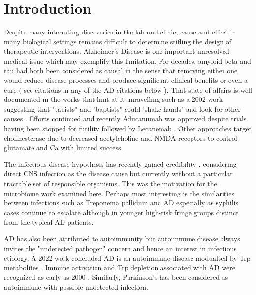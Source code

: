 \documentclass[aps,secnumarabic,balancelastpage,amsmath,amssymb,nofootinbib]{revtex4}
\begin{document}
\maketitle
\newpage
\tableofcontents
\newpage

\section{Introduction  }

Despite many interesting discoveries in the lab and clinic,
cause and effect in many biological settings remains difficult
to determine  stifling the design of therapeutic interventions.
Alzheimer's Disease is one important unresolved medical issue
which may exemplify this limitation. For decades, amyloid beta and tau
had both been considered as causal in the sense that removing
either one would reduce disease processes and produce
significant clinical benefits or even a cure
( see citations in any of the AD citations below ).  
That state of affairs is well documented 
in the works
that hint at it unravelling\cite{PMID37833948}  such as a 2002 work 
suggesting that  "tauists" and "baptists" could 'shake hands"
and look for other causes \cite{PMID11801334}. Efforts
continued and recently
Aducanumab was approved despite trials having been stopped for futility
\cite{PMC8491638}
followed by Lecanemab \cite{PMC10119064}
\cite{vanDyck_Swanson_Aisen_Lecanemab_Early_Alzheimer_2023}. 
Other approaches   target  cholinesterase  
 \cite{PMC4052996} 
due to decreased acetylcholine and NMDA receptors 
\cite{PMC6375899} to control  glutamate and Ca 
with limited success.

The infectious disease hypothesis has recently gained  
credibility  \cite{10.1371/journal.ppat.1010929}.
\cite{10.3389/fcimb.2023.1123228}
\cite{Lathe_Schultek_Balin_Establishment_consensus_2023}
considering direct CNS infection as the disease cause but currently
without a particular tractable set of responsible organisms.
This was the motivation for the microbiome work
\cite{10.3389/fcimb.2023.1123228} examined here.
Perhaps most interesting is the similarities between
 infections such as  Treponema pallidum  and AD
\cite{PMC4399390} especially as  syphilis cases
continue to escalate although in younger high-risk fringe
groups
\cite{Amerson_CastilloValladares_Leslie_Resurgence_Syphilis_2022}
distinct from the typical AD patients.  


AD has also been attributed to autoimmunity but 
 autoimmune disease always invites the "undetected
pathogen" concern and hence an interest in infectious etiology.
A 2022 work concluded AD is an autoimmune disease modualted 
by Trp metabolites  
\cite{DiezCecilia_Kolaj_Santos_Alzheimer_disease_2022}.
Immune activation and Trp depletion associated with AD were recognized
as early as 2000 \cite{Widner2000}.
Similarly, Parkinson's has been considered as autoimmune 
\cite{PMID37741513} with possible undetected infection.
\end{document}
